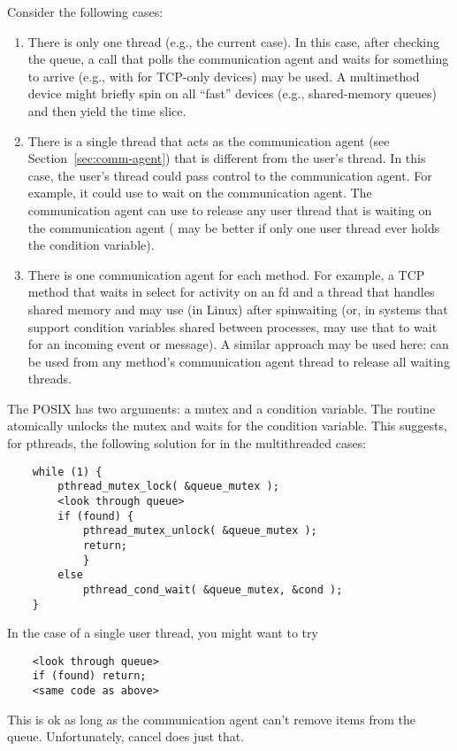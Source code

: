 \documentclass{article}
\begin{document}
\begin{adi3}
\begin{mmadi}
Consider the following cases:
\begin{enumerate}
\item There is only one thread (e.g., the current  case).  In this
  case, after checking the queue, a call that polls the communication agent
  and waits for something to arrive (e.g., with  for TCP-only
  devices) may be used.  A multimethod device might briefly spin on all
  ``fast'' devices (e.g., shared-memory queues) and then yield the time slice.
\item There is a single thread that acts as the communication agent (see
  Section~\ref{sec:comm-agent}) that is different from the user's thread.
  In this case, the user's thread could pass control to the communication
  agent.  For example, it could use  to wait on the
  communication agent.  The communication agent can use
   to release any user thread that is waiting on
  the communication agent ( may be better if only
  one user thread ever holds the condition variable).
\item There is one communication agent for each method.  For example,
  a TCP method that waits in select for activity on an fd and a thread that
  handles shared memory and may use (in Linux)  after
  spinwaiting (or, in systems that support condition variables shared between
  processes, may use that to wait for an incoming event or message).
  A similar approach may be used here:  can be
  used from any method's communication agent thread to release all waiting
  threads. 
\end{enumerate}


The POSIX  has two arguments: a mutex and a condition
variable.  The routine atomically unlocks the mutex and waits for the
condition variable. This suggests, for pthreads, the following solution for
 in the multithreaded cases:
\begin{verbatim}
    while (1) {
        pthread_mutex_lock( &queue_mutex );
        <look through queue>
        if (found) {
            pthread_mutex_unlock( &queue_mutex );
            return;
            }
        else 
            pthread_cond_wait( &queue_mutex, &cond );
    }
\end{verbatim}
In the case of a single user thread, you might want to try
\begin{verbatim}
    <look through queue>
    if (found) return;
    <same code as above>
\end{verbatim}
This is ok as long as the communication agent can't remove items from the
queue.  Unfortunately, cancel does just that.  


\end{mmadi}
\end{adi3}
\end{document}
